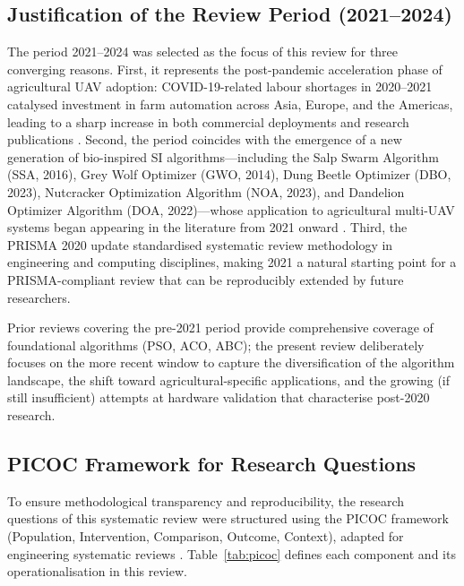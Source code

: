 \documentclass[review,3p,times]{elsarticle}
\begin{document}
\subsection{Justification of the Review Period (2021--2024)}

The period 2021--2024 was selected as the focus of this review for three converging reasons. First, it represents the post-pandemic acceleration phase of agricultural UAV adoption: COVID-19-related labour shortages in 2020--2021 catalysed investment in farm automation across Asia, Europe, and the Americas, leading to a sharp increase in both commercial deployments and research publications \cite{tsouros2019,mogili2018}. Second, the period coincides with the emergence of a new generation of bio-inspired SI algorithms---including the Salp Swarm Algorithm (SSA, 2016), Grey Wolf Optimizer (GWO, 2014), Dung Beetle Optimizer (DBO, 2023), Nutcracker Optimization Algorithm (NOA, 2023), and Dandelion Optimizer Algorithm (DOA, 2022)---whose application to agricultural multi-UAV systems began appearing in the literature from 2021 onward \cite{li2023,xiao2023}. Third, the PRISMA 2020 update \cite{page2021} standardised systematic review methodology in engineering and computing disciplines, making 2021 a natural starting point for a PRISMA-compliant review that can be reproducibly extended by future researchers.

Prior reviews covering the pre-2021 period \cite{chung2018,puente2022,sharma2022,aitsaadi2022} provide comprehensive coverage of foundational algorithms (PSO, ACO, ABC); the present review deliberately focuses on the more recent window to capture the diversification of the algorithm landscape, the shift toward agricultural-specific applications, and the growing (if still insufficient) attempts at hardware validation that characterise post-2020 research.

\subsection{PICOC Framework for Research Questions}
\label{subsec:picoc}

To ensure methodological transparency and reproducibility, the research questions of this systematic review were structured using the PICOC framework (Population, Intervention, Comparison, Outcome, Context), adapted for engineering systematic reviews \cite{brambilla2013,bayindir2016}. Table~\ref{tab:picoc} defines each component and its operationalisation in this review.
\end{document}
